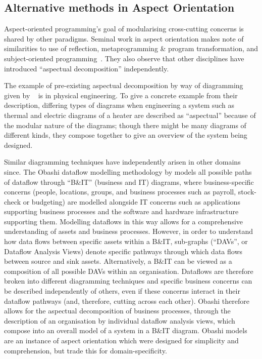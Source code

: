 \subsection{Alternative methods in Aspect Orientation}

Aspect-oriented programming's goal of modularising cross-cutting concerns is
shared by other paradigms. Seminal work in aspect orientation makes note of
similarities to use of reflection, metaprogramming \& program transformation,
and subject-oriented programming~\cite{kiczales1997aspect,aspectj_intro}. They
also observe that other disciplines have introduced ``aspectual decomposition''
independently.

The example of pre-existing aspectual decomposition by way of diagramming given
by \citeauthor{kiczales1997aspect}~\cite{kiczales1997aspect} is in physical
engineering. To give a concrete example from their description, differing types
of diagrams when engineering a system such as thermal and electric diagrams of a
heater are described as ``aspectual'' because of the modular nature of the
diagrams; though there might be many diagrams of different kinds, they compose
together to give an overview of the system being designed.

Similar diagramming techniques have independently arisen in other domains since.
The Obashi dataflow modelling methodology\cite{obashimethodology} by
\citeauthor{obashimethodology} models all possible paths of dataflow through
``B\&IT'' (business and IT) diagrams, where business-specific concerns (people,
locations, groups, and business processes such as payroll, stock-check or
budgeting) are modelled alongside IT concerns such as applications supporting
business processes and the software and hardware infrastructure supporting them.
Modelling dataflows in this way allows for a comprehensive understanding of
assets and business processes. However, in order to understand how data flows
between specific assets within a B\&IT, sub-graphs (``DAVs'', or Dataflow
Analysis Views) denote specific pathways through which data flows between source
and sink assets. Alternatively, a B\&IT can be viewed as a composition of all
possible DAVs within an organisation. Dataflows are therefore broken into
different diagramming techniques and specific business concerns can be described
independently of others, even if these concerns interact in their dataflow
pathways (and, therefore, cutting across each other). Obashi therefore allows
for the aspectual decomposition of business processes, through the description
of an organisation by individual dataflow analysis views, which compose into an
overall model of a system in a B\&IT diagram. Obashi models are an instance of
aspect orientation which were designed for simplicity and
comprehension\cite{obashimethodology,seow2011obashi}, but trade this for
domain-specificity.

